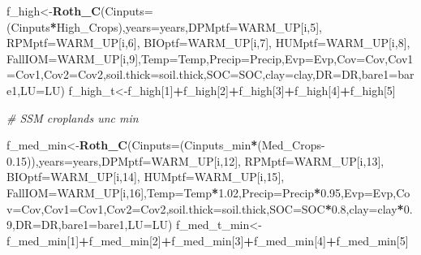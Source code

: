 \documentclass[
  10pt,
  b5paper,
]{book}
\newenvironment{Shaded}{\begin{snugshade}}{\end{snugshade}}
\newcommand{\CommentTok}[1]{\textcolor[rgb]{0.56,0.35,0.01}{\textit{#1}}}
\newcommand{\DataTypeTok}[1]{\textcolor[rgb]{0.13,0.29,0.53}{#1}}
\newcommand{\DecValTok}[1]{\textcolor[rgb]{0.00,0.00,0.81}{#1}}
\newcommand{\FloatTok}[1]{\textcolor[rgb]{0.00,0.00,0.81}{#1}}
\newcommand{\KeywordTok}[1]{\textcolor[rgb]{0.13,0.29,0.53}{\textbf{#1}}}
\newcommand{\NormalTok}[1]{#1}
\newcommand{\OperatorTok}[1]{\textcolor[rgb]{0.81,0.36,0.00}{\textbf{#1}}}
\begin{document}
\begin{Shaded}
\begin{Highlighting}[]
\NormalTok{f_high<-}\KeywordTok{Roth_C}\NormalTok{(}\DataTypeTok{Cinputs=}\NormalTok{(Cinputs}\OperatorTok{*}\NormalTok{High_Crops),}\DataTypeTok{years=}\NormalTok{years,}\DataTypeTok{DPMptf=}\NormalTok{WARM_UP[i,}\DecValTok{5}\NormalTok{], }\DataTypeTok{RPMptf=}\NormalTok{WARM_UP[i,}\DecValTok{6}\NormalTok{], }\DataTypeTok{BIOptf=}\NormalTok{WARM_UP[i,}\DecValTok{7}\NormalTok{], }\DataTypeTok{HUMptf=}\NormalTok{WARM_UP[i,}\DecValTok{8}\NormalTok{], }\DataTypeTok{FallIOM=}\NormalTok{WARM_UP[i,}\DecValTok{9}\NormalTok{],}\DataTypeTok{Temp=}\NormalTok{Temp,}\DataTypeTok{Precip=}\NormalTok{Precip,}\DataTypeTok{Evp=}\NormalTok{Evp,}\DataTypeTok{Cov=}\NormalTok{Cov,}\DataTypeTok{Cov1=}\NormalTok{Cov1,}\DataTypeTok{Cov2=}\NormalTok{Cov2,}\DataTypeTok{soil.thick=}\NormalTok{soil.thick,}\DataTypeTok{SOC=}\NormalTok{SOC,}\DataTypeTok{clay=}\NormalTok{clay,}\DataTypeTok{DR=}\NormalTok{DR,}\DataTypeTok{bare1=}\NormalTok{bare1,}\DataTypeTok{LU=}\NormalTok{LU)}
\NormalTok{f_high_t<-f_high[}\DecValTok{1}\NormalTok{]}\OperatorTok{+}\NormalTok{f_high[}\DecValTok{2}\NormalTok{]}\OperatorTok{+}\NormalTok{f_high[}\DecValTok{3}\NormalTok{]}\OperatorTok{+}\NormalTok{f_high[}\DecValTok{4}\NormalTok{]}\OperatorTok{+}\NormalTok{f_high[}\DecValTok{5}\NormalTok{]}

\CommentTok{# SSM croplands unc min}

\NormalTok{f_med_min<-}\KeywordTok{Roth_C}\NormalTok{(}\DataTypeTok{Cinputs=}\NormalTok{(Cinputs_min}\OperatorTok{*}\NormalTok{(Med_Crops}\FloatTok{-0.15}\NormalTok{)),}\DataTypeTok{years=}\NormalTok{years,}\DataTypeTok{DPMptf=}\NormalTok{WARM_UP[i,}\DecValTok{12}\NormalTok{], }\DataTypeTok{RPMptf=}\NormalTok{WARM_UP[i,}\DecValTok{13}\NormalTok{], }\DataTypeTok{BIOptf=}\NormalTok{WARM_UP[i,}\DecValTok{14}\NormalTok{], }\DataTypeTok{HUMptf=}\NormalTok{WARM_UP[i,}\DecValTok{15}\NormalTok{], }\DataTypeTok{FallIOM=}\NormalTok{WARM_UP[i,}\DecValTok{16}\NormalTok{],}\DataTypeTok{Temp=}\NormalTok{Temp}\OperatorTok{*}\FloatTok{1.02}\NormalTok{,}\DataTypeTok{Precip=}\NormalTok{Precip}\OperatorTok{*}\FloatTok{0.95}\NormalTok{,}\DataTypeTok{Evp=}\NormalTok{Evp,}\DataTypeTok{Cov=}\NormalTok{Cov,}\DataTypeTok{Cov1=}\NormalTok{Cov1,}\DataTypeTok{Cov2=}\NormalTok{Cov2,}\DataTypeTok{soil.thick=}\NormalTok{soil.thick,}\DataTypeTok{SOC=}\NormalTok{SOC}\OperatorTok{*}\FloatTok{0.8}\NormalTok{,}\DataTypeTok{clay=}\NormalTok{clay}\OperatorTok{*}\FloatTok{0.9}\NormalTok{,}\DataTypeTok{DR=}\NormalTok{DR,}\DataTypeTok{bare1=}\NormalTok{bare1,}\DataTypeTok{LU=}\NormalTok{LU)}
\NormalTok{f_med_t_min<-f_med_min[}\DecValTok{1}\NormalTok{]}\OperatorTok{+}\NormalTok{f_med_min[}\DecValTok{2}\NormalTok{]}\OperatorTok{+}\NormalTok{f_med_min[}\DecValTok{3}\NormalTok{]}\OperatorTok{+}\NormalTok{f_med_min[}\DecValTok{4}\NormalTok{]}\OperatorTok{+}\NormalTok{f_med_min[}\DecValTok{5}\NormalTok{]}


\end{Highlighting}
\end{Shaded}
\end{document}
